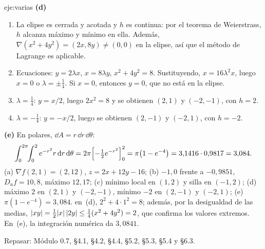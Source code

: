 \begin{solucion}{eje:varias}
\noindent\textbf{(d)}
\begin{enumerate}[label=\arabic*.]
  \item La elipse es cerrada y acotada y $h$ es continua: por el teorema de Weierstrass, $h$ alcanza máximo y mínimo en ella. Además, $\nabla(x^{2}+4y^{2})=(2x,8y)\neq(0,0)$ en la elipse, así que el método de Lagrange es aplicable.
  \item Ecuaciones: $y=2\lambda x$, $x=8\lambda y$, $x^{2}+4y^{2}=8$. Sustituyendo, $x=16\lambda^{2}x$, luego $x=0$ o $\lambda=\pm\frac14$. Si $x=0$, entonces $y=0$, que no está en la elipse.
  \item $\lambda=\frac14$: $y=x/2$, luego $2x^{2}=8$ y se obtienen $(2,1)$ y $(-2,-1)$, con $h=2$.
  \item $\lambda=-\frac14$: $y=-x/2$, luego se obtienen $(2,-1)$ y $(-2,1)$, con $h=-2$.
\end{enumerate}

\noindent\textbf{(e)} En polares, $\dd A=r\,\dd r\,\dd\theta$:
\[
\int_0^{2\pi}\!\!\int_0^{2}e^{-r^{2}}r\,\mathrm{d} r\,\mathrm{d}\theta=2\pi\Bigl[-\tfrac12e^{-r^{2}}\Bigr]_0^{2}=\pi\bigl(1-e^{-4}\bigr)=3{,}1416\cdot0{,}9817=3{,}084.
\]
\resultado (a) $\nabla f(2,1)=(2,12)$, $z=2x+12y-16$; (b) $-1{,}0$ frente a $-0{,}9851$, $D_uf=10{,}8$, máximo $12{,}17$; (c) mínimo local en $(1,2)$ y silla en $(-1,2)$; (d) máximo $2$ en $(2,1)$ y $(-2,-1)$, mínimo $-2$ en $(2,-1)$ y $(-2,1)$; (e) $\pi(1-e^{-4})=3{,}084$.
\comprobacion en~(d), $2^{2}+4\cdot1^{2}=8$; además, por la desigualdad de las medias, $\lvert xy\rvert=\frac12\lvert x\rvert\,\lvert2y\rvert\le\frac14(x^{2}+4y^{2})=2$, que confirma los valores extremos. En~(e), la integración numérica da $3{,}0841$.


\noindent Repasar: Módulo 0.7, §4.1, §4.2, §4.4, §5.2, §5.3, §5.4 y §6.3.
\end{solucion}

